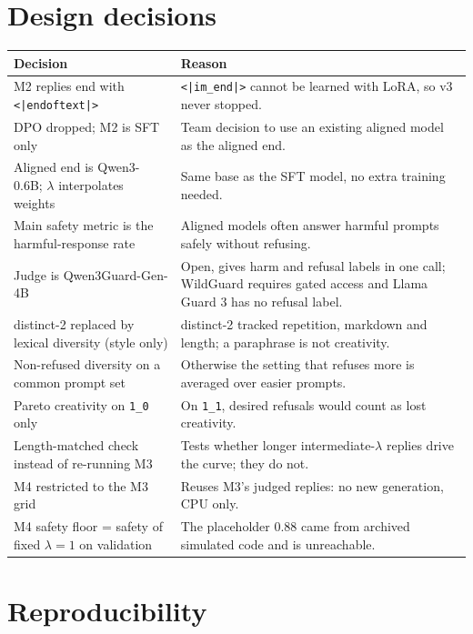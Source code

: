 \documentclass[11pt,a4paper]{article}
\newcommand{\q}[1]{\texttt{#1}}          %
\newcommand{\lam}{\lambda}
\begin{document}
\appendix

\section{Design decisions}
\label{app:decisions}

\begin{table}[h]
  \centering
  \small
  \begin{tabularx}{\linewidth}{lL}
    \toprule
    Decision & Reason \\
    \midrule
    M2 replies end with \texttt{<|endoftext|>} & \texttt{<|im\_end|>} cannot be learned with LoRA, so v3 never stopped. \\
    DPO dropped; M2 is SFT only & Team decision to use an existing aligned model as the aligned end. \\
    Aligned end is Qwen3-0.6B; $\lam$ interpolates weights & Same base as the SFT model, no extra training needed. \\
    Main safety metric is the harmful-response rate & Aligned models often answer harmful prompts safely without refusing. \\
    Judge is Qwen3Guard-Gen-4B & Open, gives harm and refusal labels in one call; WildGuard requires gated access and Llama Guard 3 has no refusal label. \\
    distinct-2 replaced by lexical diversity (style only) & distinct-2 tracked repetition, markdown and length; a paraphrase is not creativity. \\
    Non-refused diversity on a common prompt set & Otherwise the setting that refuses more is averaged over easier prompts. \\
    Pareto creativity on \q{1\_0} only & On \q{1\_1}, desired refusals would count as lost creativity. \\
    Length-matched check instead of re-running M3 & Tests whether longer intermediate-$\lam$ replies drive the curve; they do not. \\
    M4 restricted to the M3 grid & Reuses M3's judged replies: no new generation, CPU only. \\
    M4 safety floor = safety of fixed $\lam=1$ on validation & The placeholder 0.88 came from archived simulated code and is unreachable. \\
    \bottomrule
  \end{tabularx}
\end{table}

\section{Reproducibility}
\label{app:repro}
\end{document}
